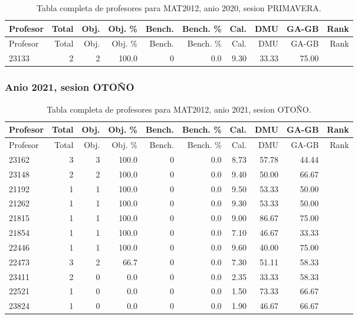 \begingroup
\scriptsize
\setlength{\tabcolsep}{3pt}
\begin{longtable}{lrrrrrrrrr}
\caption{Tabla completa de profesores para MAT2012, anio 2020, sesion PRIMAVERA.}\label{tab:prof-period-mat2012-2020-primavera}\\
\toprule
Profesor & Total & Obj. & Obj. \% & Bench. & Bench. \% & Cal. & DMU & GA-GB & Rank \\
\midrule
\endfirsthead
\toprule
Profesor & Total & Obj. & Obj. \% & Bench. & Bench. \% & Cal. & DMU & GA-GB & Rank \\
\midrule
\endhead
23133 & 2 & 2 & 100.0 & 0 & 0.0 & 9.30 & 33.33 & 75.00 &  \\
\bottomrule
\end{longtable}
\endgroup

\subsubsection{Anio 2021, sesion OTOÑO}

\begingroup
\scriptsize
\setlength{\tabcolsep}{3pt}
\begin{longtable}{lrrrrrrrrr}
\caption{Tabla completa de profesores para MAT2012, anio 2021, sesion OTOÑO.}\label{tab:prof-period-mat2012-2021-oto-o}\\
\toprule
Profesor & Total & Obj. & Obj. \% & Bench. & Bench. \% & Cal. & DMU & GA-GB & Rank \\
\midrule
\endfirsthead
\toprule
Profesor & Total & Obj. & Obj. \% & Bench. & Bench. \% & Cal. & DMU & GA-GB & Rank \\
\midrule
\endhead
23162 & 3 & 3 & 100.0 & 0 & 0.0 & 8.73 & 57.78 & 44.44 &  \\
23148 & 2 & 2 & 100.0 & 0 & 0.0 & 9.40 & 50.00 & 66.67 &  \\
21192 & 1 & 1 & 100.0 & 0 & 0.0 & 9.50 & 53.33 & 50.00 &  \\
21262 & 1 & 1 & 100.0 & 0 & 0.0 & 9.30 & 53.33 & 50.00 &  \\
21815 & 1 & 1 & 100.0 & 0 & 0.0 & 9.00 & 86.67 & 75.00 &  \\
21854 & 1 & 1 & 100.0 & 0 & 0.0 & 7.10 & 46.67 & 33.33 &  \\
22446 & 1 & 1 & 100.0 & 0 & 0.0 & 9.60 & 40.00 & 75.00 &  \\
22473 & 3 & 2 & 66.7 & 0 & 0.0 & 7.30 & 51.11 & 58.33 &  \\
23411 & 2 & 0 & 0.0 & 0 & 0.0 & 2.35 & 33.33 & 58.33 &  \\
22521 & 1 & 0 & 0.0 & 0 & 0.0 & 1.50 & 73.33 & 66.67 &  \\
23824 & 1 & 0 & 0.0 & 0 & 0.0 & 1.90 & 46.67 & 66.67 &  \\
\bottomrule
\end{longtable}
\endgroup

